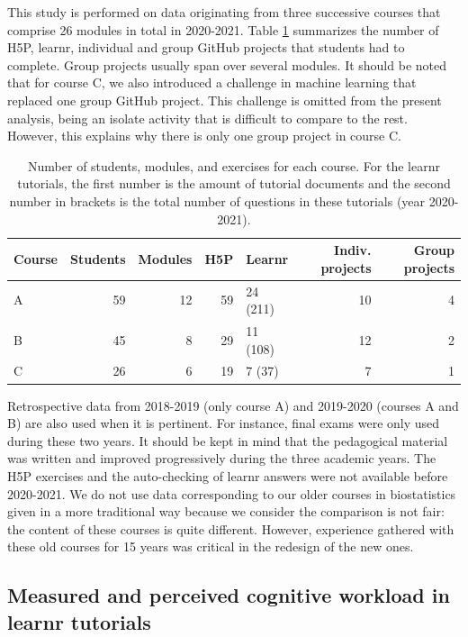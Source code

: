 \documentclass{aims}
\theoremstyle{definition}
\begin{document}
This study is performed on data originating from three successive
courses that comprise 26 modules in total in 2020-2021. Table
\ref {tab:tab_course} summarizes the number of H5P, learnr, individual
and group GitHub projects that students had to complete. Group projects
usually span over several modules. It should be noted that for course C,
we also introduced a challenge in machine learning that replaced one
group GitHub project. This challenge is omitted from the present
analysis, being an isolate activity that is difficult to compare to the
rest. However, this explains why there is only one group project in
course C.

\begin{table}

\caption{\label{tab:tab_course_summary}\label{tab:tab_course} Number of students, modules, and exercises for each course. For the learnr tutorials, the first number is the amount of tutorial documents and the second number in brackets is the total number of questions in these tutorials (year 2020-2021).}
\centering
\begin{tabular}[t]{l|r|r|r|l|r|r}
\hline
Course & Students & Modules & H5P & Learnr & Indiv. projects & Group projects\\
\hline
A & 59 & 12 & 59 & 24 (211) & 10 & 4\\
\hline
B & 45 & 8 & 29 & 11 (108) & 12 & 2\\
\hline
C & 26 & 6 & 19 & 7 (37) & 7 & 1\\
\hline
\end{tabular}
\end{table}

Retrospective data from 2018-2019 (only course A) and 2019-2020 (courses
A and B) are also used when it is pertinent. For instance, final exams
were only used during these two years. It should be kept in mind that
the pedagogical material was written and improved progressively during
the three academic years. The H5P exercises and the auto-checking of
learnr answers were not available before 2020-2021. We do not use data
corresponding to our older courses in biostatistics given in a more
traditional way because we consider the comparison is not fair: the
content of these courses is quite different. However, experience
gathered with these old courses for 15 years was critical in the
redesign of the new ones.

\hypertarget{measured-and-perceived-cognitive-workload-in-learnr-tutorials}{%
\subsection{Measured and perceived cognitive workload in learnr
tutorials}\label{measured-and-perceived-cognitive-workload-in-learnr-tutorials}}
\end{document}
